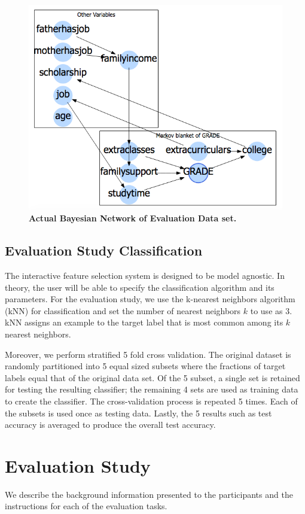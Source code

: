 \begin{figure}
    \centering
    \includegraphics[width=.8\textwidth]{actualBN}
    \caption{\textbf{ Actual Bayesian Network of Evaluation Data set.}}
    \label{fig:actualBN}
\end{figure}

\subsection{ Evaluation Study Classification }
The interactive feature selection system is designed to be model agnostic. In theory, the user will be able to specify the classification algorithm and its parameters. For the evaluation study, we use the k-nearest neighbors algorithm (kNN) for classification and set the number of nearest neighbors $k$ to use as 3. kNN assigns an example to the target label that is most common among its $k$ nearest neighbors.

Moreover, we perform stratified 5 fold cross validation. The original dataset is randomly partitioned into 5 equal sized subsets where the fractions of target labels equal that of the original data set. Of the 5 subset, a single set is retained for testing the resulting classifier; the remaining 4 sets are used as training data to create the classifier. The cross-validation process is repeated 5 times. Each of the subsets is used once as testing data. Lastly, the 5 results such as test accuracy is averaged to produce the overall test accuracy.

\section { Evaluation Study }
We describe the background information presented to the participants and the instructions for each of the evaluation tasks.

